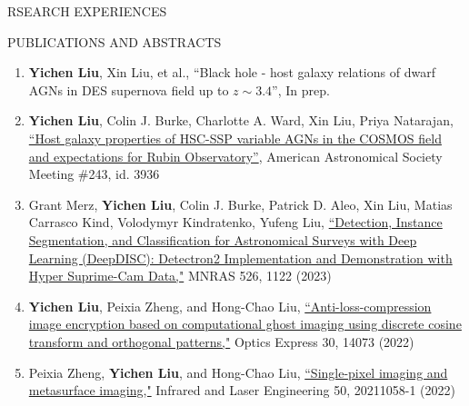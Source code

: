 \documentclass[10pt]{article} %
\begin{document}
\begin{section}{RSEARCH EXPERIENCES}
\end{section}

\begin{section}{PUBLICATIONS AND ABSTRACTS}
    
\begin{enumerate}[leftmargin=1.5em]
    \item \label{inprep}\textbf{Yichen Liu}, Xin Liu, et al., ``Black hole - host galaxy relations of dwarf AGNs in DES supernova field up to $z\sim3.4$'', In prep.
    \item \label{aas243} \textbf{Yichen Liu}, Colin J. Burke, Charlotte A. Ward, Xin Liu, Priya Natarajan, \href{https://submissions.mirasmart.com/AAS243/Itinerary/PresentationDetail.aspx?evdid=500}{``Host galaxy properties of HSC-SSP variable AGNs in the COSMOS field and expectations for Rubin Observatory''}, American Astronomical Society Meeting \#243, id. 3936
    \item \label{mnras} Grant Merz, \textbf{Yichen Liu}, Colin J. Burke, Patrick D. Aleo, Xin Liu, Matias Carrasco Kind, Volodymyr Kindratenko, Yufeng Liu, \href{https://academic.oup.com/mnras/advance-article-abstract/doi/10.1093/mnras/stad2785/7273850?redirectedFrom=fulltext}{``Detection, Instance Segmentation, and Classification for Astronomical Surveys with Deep Learning (DeepDISC): Detectron2 Implementation and Demonstration with Hyper Suprime-Cam Data,"} MNRAS 526, 1122 (2023)
    \item \label{oe} \textbf{Yichen Liu}, Peixia Zheng, and Hong-Chao Liu, \href{https://opg.optica.org/oe/fulltext.cfm?uri=oe-30-9-14073&id=471300}{``Anti-loss-compression image encryption based on computational ghost imaging using discrete cosine transform and orthogonal patterns,"} Optics Express 30, 14073 (2022)
    \item \label{irla} Peixia Zheng, \textbf{Yichen Liu}, and Hong-Chao Liu, \href{http://www.irla.cn/cn/article/doi/10.3788/IRLA20211058}{``Single-pixel imaging and metasurface imaging,"} Infrared and Laser Engineering 50, 20211058-1 (2022)  
\end{enumerate}

\end{section}
\end{document}
